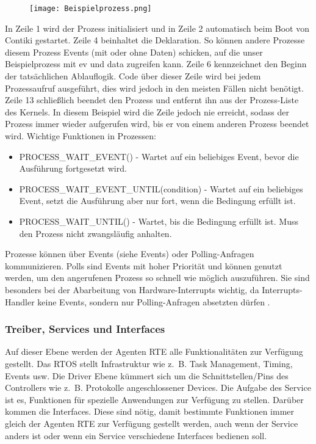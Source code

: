\begin{figure}[h!]
	\centering
		\texttt{[image: Beispielprozess.png]}
	\label{Beispielprozess}
\end{figure}
In Zeile 1 wird der Prozess initialisiert und in Zeile 2 automatisch beim Boot von Contiki gestartet. Zeile 4 beinhaltet die
Deklaration. So k\"onnen andere Prozesse diesem Prozess Events (mit oder ohne Daten) schicken, auf die unser Beispielprozess 
mit ev und data zugreifen kann. Zeile 6 kennzeichnet den Beginn der tats\"achlichen Ablauflogik. Code \"uber dieser Zeile wird 
bei jedem Prozessaufruf ausgef\"uhrt, dies wird jedoch in den meisten F\"allen nicht ben\"otigt. Zeile 13 schlie{\ss}lich beendet
den Prozess und entfernt ihn aus der Prozess-Liste des Kernels. In diesem Beispiel wird die Zeile jedoch nie erreicht, sodass der Prozess immer wieder aufgerufen wird, bis er von einem anderen Prozess beendet wird.
Wichtige Funktionen in Prozessen:
\begin{itemize}
\item PROCESS\_WAIT\_EVENT() - Wartet auf ein beliebiges Event, bevor die Ausf\"{u}hrung fortgesetzt wird.
\item PROCESS\_WAIT\_EVENT\_UNTIL(condition) - Wartet auf ein beliebiges Event, setzt die Ausf\"{u}hrung aber nur fort, wenn die Bedingung erf\"{u}llt ist.
\item PROCESS\_WAIT\_UNTIL() - Wartet, bis die Bedingung erf\"ullt ist. Muss den Prozess nicht zwangsl\"{a}ufig anhalten.
\end{itemize}
Prozesse k\"onnen \"uber Events (siehe Events) oder Polling-Anfragen kommunizieren.  Polls sind Events mit hoher Priorit\"at und 
k\"onnen genutzt werden, um den angerufenen Prozess so schnell wie m\"oglich auszuf\"uhren. Sie
sind besonders bei der Abarbeitung von Hardware-Interrupts wichtig, da Interrupts-Handler keine Events, sondern nur
Polling-Anfragen absetzten d\"urfen \cite[vgl.][S. 7]{Walter:2010}.

\subsubsection{Treiber, Services und Interfaces}
Auf dieser Ebene werden der Agenten RTE alle Funktionalitäten zur Verfügung gestellt. Das RTOS stellt Infrastruktur wie z.~B. Task Management, Timing, Events usw.
Die Driver Ebene kümmert sich um die Schnittstellen/Pins des Controllers wie z.~B. Protokolle angeschlossener
Devices\cite[S. 26]{Stasch:Hahn}. Die Aufgabe des Service ist es, Funktionen für spezielle Anwendungen zur Verfügung zu stellen.
Darüber kommen die Interfaces. Diese sind nötig, damit bestimmte Funktionen immer gleich der Agenten RTE zur Verfügung gestellt werden, auch wenn der Service anders ist oder wenn ein Service verschiedene Interfaces bedienen soll\cite[S. 26]{Stasch:Hahn}.

